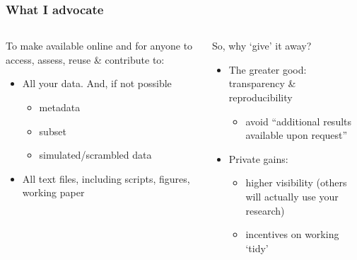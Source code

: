 \documentclass[ignorenonframetext]{beamer}
\begin{document}
\begin{frame}
  \frametitle{What I advocate}
  \begin{columns}
    \begin{column}{.5\textwidth}
      To make available online and for anyone to \alert{access}, \alert{assess}, \alert{reuse} \& \alert{contribute} to:
      \begin{itemize}
        \item All your \alert{data}. And, if not possible
          \begin{itemize}
            \item metadata
            \item subset
            \item simulated/scrambled data
          \end{itemize}
        \item All \alert{text} files, including scripts, figures, working paper\pause
        \end{itemize}
    \end{column}

    \begin{column}{.5\textwidth}
      So, why `give' it away?
      \begin{itemize}
        \item The greater good: \alert{transparency} \& \alert{reproducibility}
          \begin{itemize}
            \item avoid ``additional results available upon request''
          \end{itemize}
        \item \alert{Private} gains:
          \begin{itemize}
            \item higher visibility (others will actually use your research)
              \item incentives on working `tidy'
          \end{itemize}
      \end{itemize}
    \end{column}
  \end{columns}
\end{frame}
\end{document}
